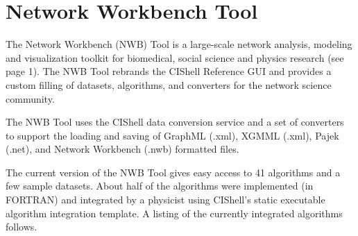 \section{Network Workbench Tool}


The Network Workbench (NWB) Tool \cite{nwb} is a large-scale network analysis, 
modeling and visualization toolkit for biomedical, social science and physics 
research (see page 1). The NWB Tool rebrands the CIShell Reference GUI and 
provides a custom filling of datasets, algorithms, and converters for the 
network science community.

The NWB Tool uses the CIShell data conversion service and a set of converters 
to support the loading and saving of GraphML (.xml), XGMML (.xml), Pajek (.net), 
and Network Workbench (.nwb) formatted files.

The current version of the NWB Tool gives easy access to 41 algorithms and a 
few sample datasets. About half of the algorithms were implemented (in FORTRAN) 
and integrated by a physicist using CIShell's static executable algorithm 
integration template. A listing of the currently integrated algorithms follows.

